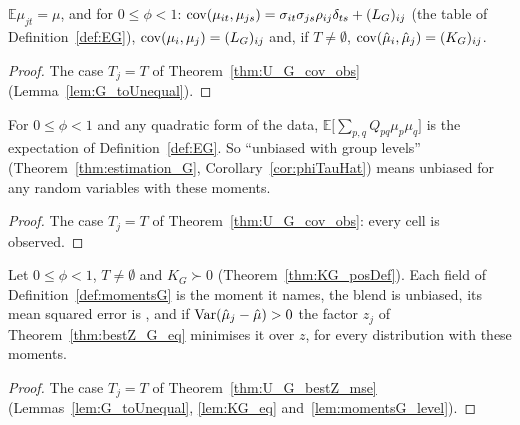 \begin{theorem}\label{thm:G_cov_obs}
  \leanok
  $\mathbb E\mu_{jt} = \mu$, and for $0 \le \phi < 1$:
  $\operatorname{cov}(\mu_{it},\mu_{js}) = \sigma_{it}\sigma_{js}\rho_{ij}\delta_{ts} + (L_G)_{ij}$
  (the table of Definition~\ref{def:EG}), $\operatorname{cov}(\mu_i,\mu_j) = (L_G)_{ij}$ and,
  if $T \ne \emptyset$, $\operatorname{cov}(\hat\mu_i,\hat\mu_j) = (K_G)_{ij}$.
\end{theorem}
\begin{proof}
  \leanok
  The case $T_j = T$ of Theorem~\ref{thm:U_G_cov_obs}
  (Lemma~\ref{lem:G_toUnequal}).
\end{proof}

\begin{theorem}\label{thm:G_integral_quad}
  \leanok
  For $0 \le \phi < 1$ and any quadratic form of the data,
  $\mathbb E\bigl[\sum_{p,q} Q_{pq}\mu_p\mu_q\bigr]$ is the expectation of
  Definition~\ref{def:EG}. So ``unbiased with group levels''
  (Theorem~\ref{thm:estimation_G}, Corollary~\ref{cor:phiTauHat}) means
  unbiased for any random variables with these moments.
\end{theorem}
\begin{proof}
  \leanok
  The case $T_j = T$ of Theorem~\ref{thm:U_G_cov_obs}: every cell is observed.
\end{proof}

\begin{theorem}\label{thm:G_bestZ_mse}
  \leanok
  Let $0 \le \phi < 1$, $T \ne \emptyset$ and $K_G \succ 0$
  (Theorem~\ref{thm:KG_posDef}). Each field of
  Definition~\ref{def:momentsG} is the moment it names, the blend is unbiased,
  its mean squared error is , and if $\operatorname{Var}(\hat\mu_j - \hat\mu) > 0$ the
  factor $z_j$ of Theorem~\ref{thm:bestZ_G_eq} minimises it over $z$, for every
  distribution with these moments.
\end{theorem}
\begin{proof}
  \leanok
  The case $T_j = T$ of Theorem~\ref{thm:U_G_bestZ_mse} (Lemmas~\ref{lem:G_toUnequal},
  \ref{lem:KG_eq} and~\ref{lem:momentsG_level}).
\end{proof}

